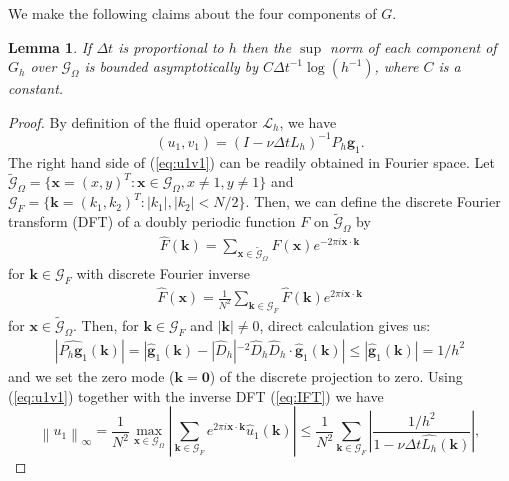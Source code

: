 \documentclass[preprint,12pt]{elsarticle}
\newcommand{\norm}[1]{\left\lVert#1\right\rVert}
\newtheorem{lemma}{Lemma}[section]
\begin{document}
We make the following claims about the four components of $G$.
\begin{lemma}
\label{lemma:Gh}
If $\Delta t$ is proportional to $h$ then the $\sup$ norm of each component of $G_h$ over $\mathcal{G}_\Omega$ is bounded asymptotically by $C {\Delta t}^{-1}\log(h^{-1})$, where $C$ is a constant.
\end{lemma}
\begin{proof}
By definition of the fluid operator $\mathcal{L}_h$, we have 
\begin{equation}
(u_1,v_1) = (I -\nu\Delta t L_h)^{-1}  P_h \mathbf{g}_1.\label{eq:u1v1}
\end{equation}
The right hand side of (\ref{eq:u1v1}) can be readily obtained in Fourier space.  Let 
$\tilde{\mathcal{G}}_\Omega =\{ \mathbf{x}=(x,y)^T : \mathbf{x} \in \mathcal{G}_\Omega, x \neq 1, y \neq 1\}$
and $\mathcal{G}_F =\{ \mathbf{k}=(k_1,k_2)^T :       |k_1|,|k_2| <N/2\}$. Then, we can define the 
 discrete Fourier transform (DFT) of a doubly periodic function $F$  on $\tilde{\mathcal{G}}_\Omega$ by
\begin{align}
\widehat{F}(\mathbf{k}) =  \sum_{\mathbf{x} \in \tilde{\mathcal{G}}_\Omega} F(\mathbf{x}) e^{-2\pi i \mathbf{x}\cdot \mathbf{k}}
\end{align}
for $\mathbf{k} \in \mathcal{G}_F$ with discrete Fourier inverse
\begin{align}
\widehat{F}(\mathbf{x}) =\frac{1}{N^2} \sum_{\mathbf{k} \in \mathcal{G}_F} \widehat{F}(\mathbf{k}) e^{2 \pi i \mathbf{x}\cdot \mathbf{k}}
\label{eq:IFT}
\end{align}
for $\mathbf{x} \in \tilde{\mathcal{G}}_\Omega $. Then, for $\mathbf{k} \in \mathcal{G}_F$  and $|\mathbf{k}| \ne 0$, 
direct calculation gives us:
\begin{align}
|\widehat{P_h \mathbf{g}_1}(\mathbf{k})| = |\hat{\mathbf{g}}_1(\mathbf{k})-|\widehat{D}_h|^{-2}\widehat{D}_h\widehat{D}_h\cdot\hat{\mathbf{g}}_1(\mathbf{k})| \leq |\hat{\mathbf{g}}_1(\mathbf{k})| = 1/h^2
\end{align}
and we set  the zero mode ($\mathbf{k}=\mathbf{0}$) of the discrete projection to zero. 
Using (\ref{eq:u1v1}) together with the inverse DFT (\ref{eq:IFT}) we have
\begin{equation}
\norm{u_1}_\infty =
\frac{1}{N^2}\max_{\mathbf{x}\in\mathcal{G}_\Omega}
\left|\sum_{\mathbf{k}\in\mathcal{G}_F}
e^{2\pi i\mathbf{x}\cdot\mathbf{k}}
\hat{u}_1(\mathbf{k})\right|
\leq
\frac{1}{N^2}\sum_{\mathbf{k}\in\mathcal{G}_F}
\left|\frac{1/h^2}
{1-\nu\Delta t \widehat{L_h}(\mathbf{k})}\right|,

\end{equation}
\end{proof}
\end{document}
